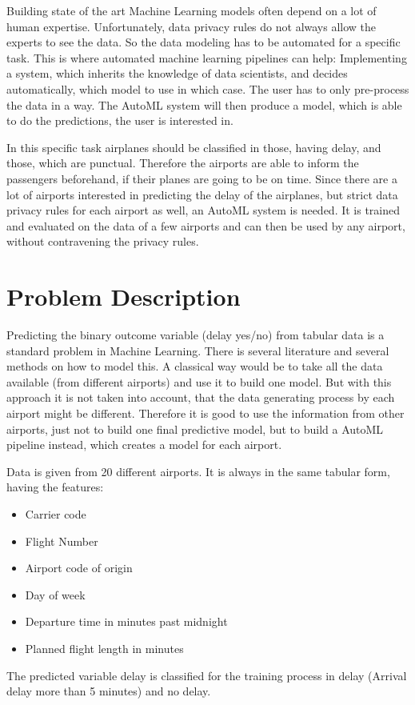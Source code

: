 \documentclass{article}
\begin{document}
Building state of the art Machine Learning models often depend on a lot of human expertise. Unfortunately, data privacy rules do not always allow the experts to see the data. So the data modeling has to be automated for a specific task. This is where automated machine learning pipelines can help: Implementing a system, which inherits the knowledge of data scientists, and decides automatically, which model to use in which case. The user has to only pre-process the data in a way. The AutoML system will then produce a model, which is able to do the predictions, the user is interested in.

In this specific task airplanes should be classified in those, having delay, and those, which are punctual. Therefore the airports are able to inform the passengers beforehand, if their planes are going to be on time. Since there are a lot of airports interested in predicting the delay of the airplanes, but strict data privacy rules for each airport as well, an AutoML system is needed. It is trained and evaluated on the data of a few airports and can then be used by any airport, without contravening the privacy rules.


\section{Problem Description}

Predicting the binary outcome variable (delay yes/no) from tabular data is a standard problem in Machine Learning. There is several literature and several methods on how to model this. A classical way would be to take all the data available (from different airports) and use it to build one model. But with this approach it is not taken into account, that the data generating process by each airport might be different. Therefore it is good to use the information from other airports, just not to build one final predictive model, but to build a AutoML pipeline instead, which creates a model for each airport.

Data is given from 20 different airports. It is always in the same tabular form, having the features:
\begin{itemize}
\item Carrier code
\item Flight Number
\item Airport code of origin
\item Day of week
\item Departure time in minutes past midnight
\item Planned flight length in minutes
\end{itemize}
The predicted variable delay is classified for the training process in delay (Arrival delay more than 5 minutes) and no delay. 
\end{document}
